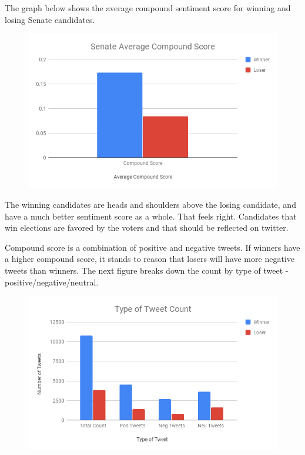 \documentclass[11pt, twoside, reqno]{book}
\begin{document}
The graph below shows the average compound sentiment score for winning and losing Senate candidates.
\begin{figure}[H]
\centering
	\includegraphics[scale=0.5]{sen_ave_score}
\end{figure}
The winning candidates are heads and shoulders above the losing candidate, and have a much better sentiment score as a whole. That feels right. Candidates that win elections are favored by the voters and that should be reflected on twitter. 

Compound score is a combination of positive and negative tweets. If winners have a higher compound score, it stands to reason that losers will have more negative tweets than winners. The next figure breaks down the count by type of tweet - positive/negative/neutral. 

\begin{figure}[H]
\centering
	\includegraphics[scale=0.5]{tweet_type}
\end{figure}
\end{document}
